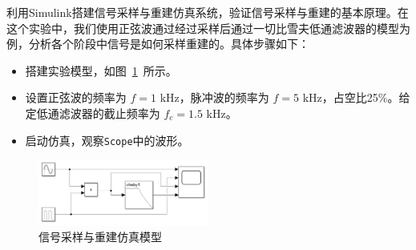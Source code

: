 利用Simulink搭建信号采样与重建仿真系统，验证信号采样与重建的基本原理。在这个实验中，我们使用正弦波通过经过采样后通过一切比雪夫低通滤波器的模型为例，分析各个阶段中信号是如何采样重建的。具体步骤如下：
\begin{itemize}
  \item 搭建实验模型，如图~\ref{fig:model1}~所示。
  \item 设置正弦波的频率为 $f = 1$ kHz，脉冲波的频率为 $f = 5$ kHz，占空比25\%。给定低通滤波器的截止频率为 $f_c = 1.5$ kHz。
  \item 启动仿真，观察\lstinline{Scope}中的波形。
\end{itemize}
\begin{figure}[htbp]
  \centering
  \includegraphics[width=0.5\textwidth]{figure/exp1/model1.png}
  \caption{信号采样与重建仿真模型}
  \label{fig:model1}
\end{figure}

